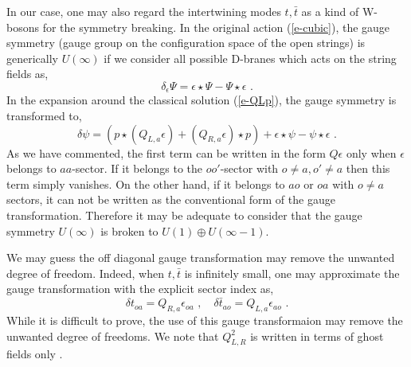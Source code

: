 \documentclass[a4paper,12pt]{article}
\begin{document}
In our case, one may also regard the intertwining modes
$t,\bar t$ as a kind of W-bosons for the symmetry breaking.
In the original action (\ref{e-cubic}), the gauge symmetry 
(gauge group on the configuration space of the open strings)
is generically $U(\infty)$ if we consider all possible
D-branes which acts on the string fields as,
\begin{equation}
 \delta_\epsilon \Psi=\epsilon\star\Psi-\Psi\star\epsilon\,\,.
\end{equation}
In the expansion around the classical solution (\ref{e-QLp}),
the gauge symmetry is transformed to,
\begin{equation}
 \delta\psi= (p\star (Q_{L,a}\epsilon)+(Q_{R,a}\epsilon)\star p)
+\epsilon\star \psi-\psi\star\epsilon\,\,.
\end{equation}
As we have commented, the first term can be written in
the form $Q\epsilon$ only when $\epsilon$ belongs to $aa$-sector.
If it belongs to the $oo'$-sector
with $o\neq a, o'\neq a$ then this term simply vanishes.
On the other hand, if it belongs to $ao$ or $oa$ with $o\neq a$
sectors, it can not be written as the conventional form of the
gauge transformation.  Therefore it may be adequate to consider that
the gauge symmetry $U(\infty)$ is broken to $U(1)\oplus U(\infty-1)$.

We may guess the off diagonal gauge transformation may
remove the unwanted degree of freedom. Indeed, when $t,\bar t$
is infinitely small, one may approximate the gauge transformation
with the explicit sector index as,
\begin{equation}
 \delta t_{oa}=Q_{R,a}\epsilon_{oa}\,\,,\quad
 \delta \bar t_{ao}= Q_{L,a}\epsilon_{ao}\,\,.
\end{equation}
While it is difficult to prove,
the use of this gauge transformaion may remove
the unwanted degree of freedoms.
We note that $Q_{L,R}^2$ is written  in terms of ghost 
fields only \cite{r-Romans}.
\end{document}
